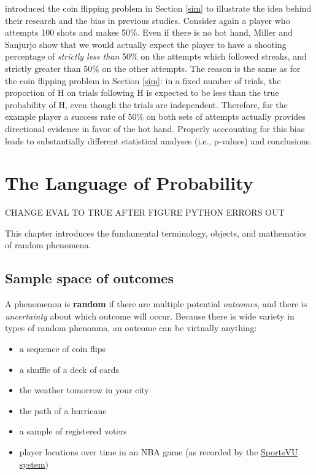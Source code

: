 \documentclass[
]{book}
\providecommand{\tightlist}{%
  \setlength{\itemsep}{0pt}\setlength{\parskip}{0pt}}
\theoremstyle{definition}
\theoremstyle{definition}
\theoremstyle{definition}
\theoremstyle{remark}
\begin{document}
\citet{MStruth} introduced the coin flipping problem in Section \ref{sim} to illustrate the idea behind their research and the
bias in previous studies. Consider again a player who attempts 100 shots
and makes 50\%. Even if there is no hot hand, Miller and Sanjurjo show that we would actually expect the player to have a shooting percentage of \emph{strictly less than} 50\% on the attempts which followed streaks, and strictly greater than 50\% on the other attempts. The reason is the same as for the coin flipping problem in Section \ref{sim}: in a fixed number of trials, the proportion of H on trials following H is expected to be less than the true probability of H, even though the trials are independent. Therefore, for the example player a success rate of 50\% on both sets of attempts actually provides directional evidence in favor of the hot hand. Properly acccounting for this bias leads to substantially different statistical analyses (i.e., p-values) and conclusions.

\hypertarget{probmath}{%
\chapter{The Language of Probability}\label{probmath}}

CHANGE EVAL TO TRUE AFTER FIGURE PYTHON ERRORS OUT

This chapter introduces the fundamental terminology, objects, and mathematics of random phenomena.

\hypertarget{samplespace}{%
\section{Sample space of outcomes}\label{samplespace}}

A phenomenon is \textbf{random} if there are multiple potential
\emph{outcomes}, and there is \emph{uncertainty} about which outcome will occur. Because there is wide variety in types of random phenomna, an outcome can be virtually anything:

\begin{itemize}
\tightlist
\item
  a sequence of coin flips
\item
  a shuffle of a deck of cards
\item
  the weather tomorrow in your city
\item
  the path of a hurricane
\item
  a sample of registered voters
\item
  player locations over time in an NBA game (as recorded by the \href{https://www.stats.com/sportvu-basketball/}{SportsVU system})
\end{itemize}
\end{document}
